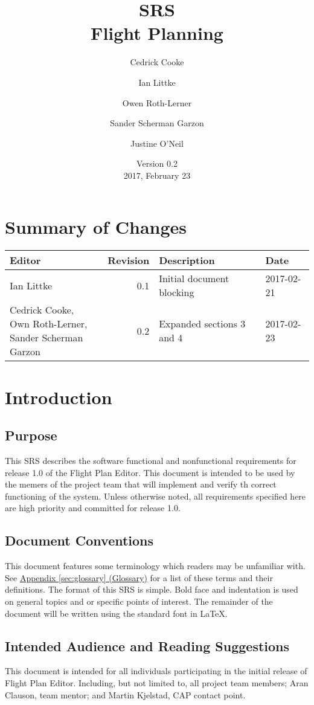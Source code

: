 \documentclass[12pt, letterpaper]{article}
\title{SRS \\
Flight Planning
}
\author{ Cedrick Cooke
    \and Ian Littke
    \and Owen Roth-Lerner
    \and Sander Scherman Garzon
    \and Justine O'Neil
}
\date{Version 0.2 \\ 2017, February 23}
\begin{document}
\maketitle

\tableofcontents
\raggedright
\section*{Summary of Changes}
\begin{tabularx}{\textwidth}{|l|r|X|l|}
\hline
Editor & Revision & Description & Date \\ \hline \hline
Ian Littke & 0.1 & Initial document blocking & 2017-02-21 \\ \hline
\makecell[cl]{Cedrick Cooke,\\ Own Roth-Lerner,\\ Sander Scherman Garzon} & 0.2 & Expanded sections 3 and 4 & 2017-02-23 \\ \hline
\end{tabularx}

\section{Introduction}
  \subsection{Purpose}
    This SRS describes the software functional and nonfunctional requirements
    for release 1.0 of the Flight Plan Editor.
    This document is intended to be used by the memers of the project team that will implement
    and verify th correct functioning of the system.
    Unless otherwise noted, all requirements specified here are high priority
    and committed for release 1.0.
  \subsection{Document Conventions}
  This document features some terminology which readers may be unfamiliar with.
  See \hyperref[sec:glossary]{Appendix \ref{sec:glossary} (Glossary)} for a list of these terms and their definitions.
  The format of this SRS is simple. Bold face and indentation is used on general topics and or specific points of interest.
  The remainder of the document will be written using the standard font in \LaTeX.
  \subsection{Intended Audience and Reading Suggestions}
  This document is intended for all individuals participating in the initial release of Flight Plan Editor.
  Including, but not limited to, all project team members; Aran Clauson, team mentor; and Martin Kjelstad, CAP contact point.
\end{document}
